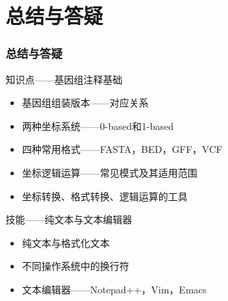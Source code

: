 \section{总结与答疑}
\begin{frame}
  \frametitle{总结与答疑}
  \begin{block}{知识点——基因组注释基础}
    \begin{itemize}
      \item 基因组组装版本——对应关系
      \item 两种坐标系统——0-based和1-based
      \item 四种常用格式——FASTA，BED，GFF，VCF
      \item 坐标逻辑运算——常见模式及其适用范围
      \item 坐标转换、格式转换、逻辑运算的工具
    \end{itemize}
  \end{block}
  \begin{block}{技能——纯文本与文本编辑器}
    \begin{itemize}
      \item 纯文本与格式化文本
      \item 不同操作系统中的换行符
      \item 文本编辑器——Notepad++，Vim，Emacs
    \end{itemize}
  \end{block}
\end{frame}
